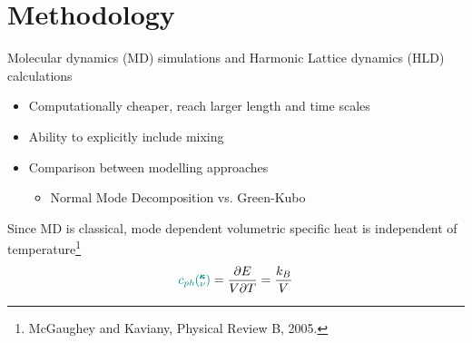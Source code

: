 \documentclass{beamer}
\newcommand{\kv}{\mspace{-4.0mu}\left(\mspace{-8.0mu}
\begin{smallmatrix}&\pmb{\kappa} \\&\nu\end{smallmatrix}
\mspace{-3.0mu}\right)}
\begin{document}
\section{Methodology}
\begin{frame}{Molecular dynamics (MD) simulations and Harmonic Lattice dynamics (HLD) calculations}
\begin{itemize}
\item Computationally cheaper, reach larger length and time scales
\item Ability to explicitly include mixing
\item Comparison between modelling approaches
\begin{itemize}
\item Normal Mode Decomposition vs. Green-Kubo
\end{itemize}
\end{itemize}


Since MD is classical, mode dependent volumetric specific heat is independent of temperature\footnote{McGaughey and Kaviany, Physical Review B, 2005.}
\begin{equation*}\label{EQ:Cph}
\textcolor{teal}{c_{ph}\kv}=\frac{\partial E}{V\partial T}=\frac{k_B}{V}	
\end{equation*}
\end{frame}
\end{document}
